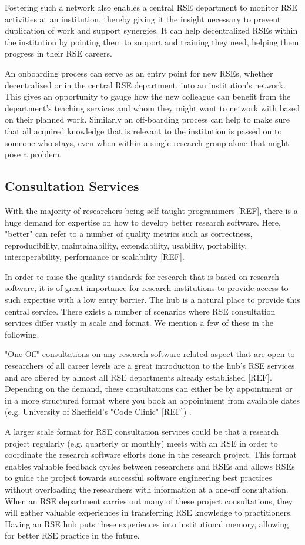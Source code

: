 \documentclass[a4paper]{article}
\begin{document}
Fostering such a network also enables a central RSE department to monitor RSE activities at an institution, thereby giving it the insight necessary to prevent duplication of work and support synergies.
It can help decentralized RSEs within the institution by pointing them to support and training they need, helping them progress in their RSE careers.

An onboarding process can serve as an entry point for new RSEs, whether decentralized or in the central RSE department, into an institution's network.
This gives an opportunity to gauge how the new colleague can benefit from the department's teaching services and whom they might want to network with based on their planned work.
Similarly an off-boarding process can help to make sure that all acquired knowledge that is relevant to the institution is passed on to someone who stays, even when within a single research group alone that might pose a problem.

\subsection{Consultation Services}
\label{sec:consultation}

With the majority of researchers being self-taught programmers [REF], there is a huge demand for expertise on how to develop better research software.
Here, "better" can refer to a number of quality metrics such as correctness, reproducibility, maintainability, extendability, usability, portability, interoperability, performance or scalability [REF].

In order to raise the quality standards for research that is based on research software, it is of great importance for research institutions to provide access to such expertise with a low entry barrier.
The hub is a natural place to provide this central service.
There exists a number of scenarios where RSE consultation services differ vastly in scale and format.
We mention a few of these in the following.

"One Off" consultations on any research software related aspect that are open to researchers of all career levels are
a great introduction to the hub's RSE services and are offered by almost all RSE departments already established [REF].
Depending on the demand, these consultations can either be by appointment or in a more structured format where you book an appointment from available dates (e.g. University of Sheffield's "Code Clinic" [REF]) .

A larger scale format for RSE consultation services could be that a research project regularly (e.g. quarterly or monthly) meets with an RSE in order to coordinate the research software efforts done in the research project.
This format enables valuable feedback cycles between researchers and RSEs and allows RSEs to guide the project
towards successful software engineering best practices without overloading the researchers with information at a one-off consultation.
When an RSE department carries out many of these project consultations, they will gather valuable experiences in transferring RSE knowledge to practitioners.
Having an RSE hub puts these experiences into institutional memory, allowing for better RSE practice in the future.
\end{document}
